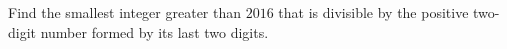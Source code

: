 Find the smallest integer greater than $2016$ that is divisible by the positive two-digit number formed by its last two digits.

